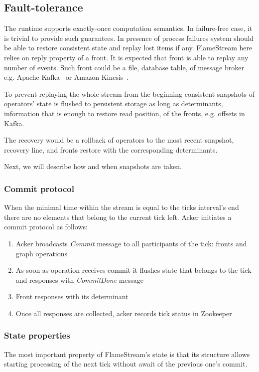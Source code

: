 \subsection{Fault-tolerance}
The runtime supports exactly-once computation semantics. In failure-free case, it is trivial to provide such guarantees. In presence of process failures system should be able to restore consistent state and replay lost items if any. FlameStream here relies on reply property of a front. It is expected that front is able to replay any number of events. Such front could be a file, database table, of message broker e.g. Apache Kafka~\cite{kreps2011kafka} or Amazon Kinesis~\cite{amazon-kinesis}. 

To prevent replaying the whole stream from the beginning consistent snapshots of operators' state is flushed to persistent storage as long as determinants, information that is enough to restore read position, of the fronts, e.g. offsets in Kafka. 

The recovery would be a rollback of operators to the most recent snapshot, recovery line, and fronts restore with the corresponding determinants.

Next, we will describe how and when snapshots are taken.

\subsubsection{Commit protocol}
When the minimal time within the stream is equal to the ticks interval's end there are no elements that belong to the current tick left. Acker initiates a commit protocol as follows: 

\begin{enumerate}
\item{Acker broadcasts {\it Commit} message to all participants of the tick: fronts and graph operations}
\item{As soon as operation receives commit it flushes state that belongs to the tick and responses with {\it CommitDone} message}
\item{Front responses with its determinant} 
\item{Once all responses are collected, acker records tick status in Zookeeper}
\end{enumerate}

\subsubsection{State properties}
The most important property of FlameStream's state is that its structure allows starting processing of the next tick without await of the previous one's commit. 

